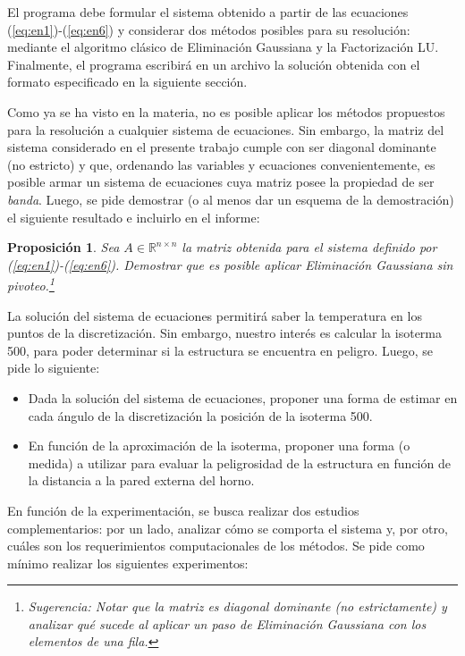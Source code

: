 \documentclass[11pt, a4paper, spanish]{article}
\theoremstyle{plain}
\newtheorem{prop}{Proposición}
\theoremstyle{remark}
\begin{document}
\begin{appendices}
      El programa debe formular el sistema obtenido a partir de las ecuaciones (\ref{eq:en1})-(\ref{eq:en6}) y considerar dos métodos posibles para su resolución: mediante el algoritmo clásico de Eliminación Gaussiana y la Factorización LU. Finalmente, el programa escribirá en un archivo la solución obtenida con el formato especificado en la siguiente sección.

      Como ya se ha visto en la materia, no es posible aplicar los métodos propuestos para la resolución a cualquier sistema de ecuaciones. Sin embargo, la matriz del sistema considerado en el presente trabajo cumple con ser diagonal dominante (no estricto) y que, ordenando las variables y ecuaciones convenientemente, es posible armar un sistema de ecuaciones cuya matriz posee la propiedad de ser \emph{banda}. Luego, se pide demostrar (o al menos dar un esquema de la demostración) el siguiente resultado e incluirlo en el informe:

      \begin{prop}
        Sea $A \in \mathbb{R}^{n \times n}$ la matriz obtenida para el sistema definido por (\ref{eq:en1})-(\ref{eq:en6}). Demostrar que es posible aplicar Eliminación Gaussiana sin pivoteo.\footnote{Sugerencia: Notar que la matriz es diagonal dominante (no estrictamente) y analizar qué sucede al aplicar un paso de Eliminación Gaussiana con los elementos de una fila.}
      \end{prop}

      La solución del sistema de ecuaciones permitirá saber la temperatura en los puntos de la discretización. Sin embargo, nuestro interés es calcular la isoterma 500, para poder determinar si la estructura se encuentra en peligro. Luego, se pide lo siguiente:

      \begin{itemize}
        \item Dada la solución del sistema de ecuaciones, proponer una forma de estimar en cada ángulo de la discretización la posición de la isoterma 500.
        \item En función de la aproximación de la isoterma, proponer una forma (o medida) a utilizar para evaluar la peligrosidad de la estructura en función de la distancia a la pared externa del horno.
      \end{itemize}

      En función de la experimentación, se busca realizar dos estudios complementarios: por un lado, analizar cómo se comporta el sistema y, por otro, cuáles son los requerimientos computacionales de los métodos. Se pide como mínimo realizar los siguientes experimentos:


\end{appendices}
\end{document}
